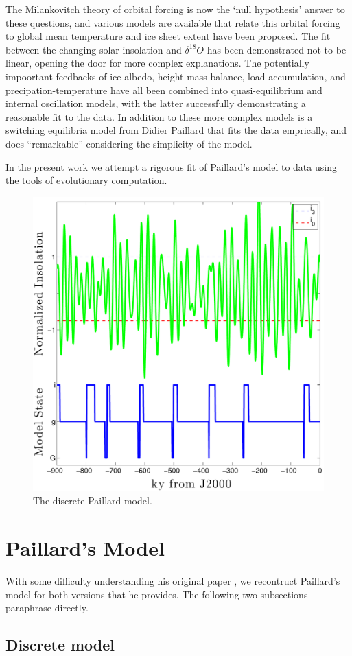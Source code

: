 The Milankovitch theory of orbital forcing is now the `null hypothesis' answer to these questions, and various models are available that relate this orbital forcing to global mean temperature and ice sheet extent have been proposed.
The fit between the changing solar insolation and $\delta ^{18} O$ has been demonstrated not to be linear, opening the door for more complex explanations.
The potentially impoortant feedbacks of ice-albedo, height-mass balance, load-accumulation, and precipation-temperature have all been combined into quasi-equilibrium and internal oscillation models, with the latter successfully demonstrating a reasonable fit to the data.
In addition to these more complex models is a switching equilibria model from Didier Paillard that fits the data emprically, and does ``remarkable'' considering the simplicity of the model.

In the present work we attempt a rigorous fit of Paillard's model to data using the tools of evolutionary computation.

\begin{figure}[tpb!]
\centering
  \includegraphics[width=.45\textwidth]{../src/discrete_plot_noname.pdf}
  \caption{
    The discrete Paillard model.
  }
  \label{fig:paillard-fig3}
\end{figure}

\section{Paillard's Model}

With some difficulty understanding his original paper \cite{paillard1998timing}, we recontruct Paillard's model for both versions that he provides.
The following two subsections paraphrase \cite{paillard1998timing} directly.

\subsection{Discrete model}

